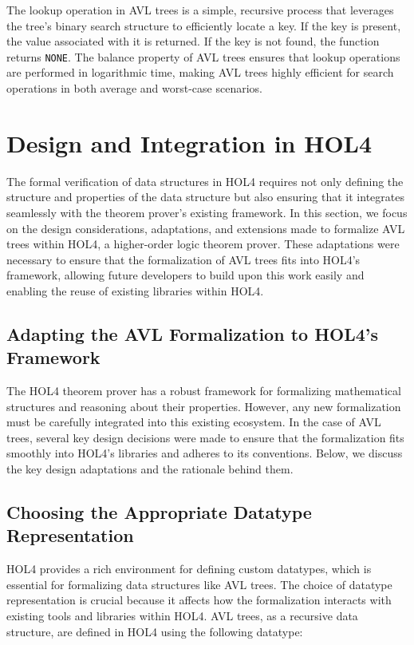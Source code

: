 \documentclass[12pt]{article}
\begin{document}
\begin{itemize}
The lookup operation in AVL trees is a simple, recursive process that leverages the tree's binary search structure to efficiently locate a key. If the key is present, the value associated with it is returned. If the key is not found, the function returns \texttt{NONE}. The balance property of AVL trees ensures that lookup operations are performed in logarithmic time, making AVL trees highly efficient for search operations in both average and worst-case scenarios.



\section{Design and Integration in HOL4}

The formal verification of data structures in HOL4 requires not only defining the structure and properties of the data structure but also ensuring that it integrates seamlessly with the theorem prover's existing framework. In this section, we focus on the design considerations, adaptations, and extensions made to formalize AVL trees within HOL4, a higher-order logic theorem prover. These adaptations were necessary to ensure that the formalization of AVL trees fits into HOL4’s framework, allowing future developers to build upon this work easily and enabling the reuse of existing libraries within HOL4.

\subsection{Adapting the AVL Formalization to HOL4’s Framework}

The HOL4 theorem prover has a robust framework for formalizing mathematical structures and reasoning about their properties. However, any new formalization must be carefully integrated into this existing ecosystem. In the case of AVL trees, several key design decisions were made to ensure that the formalization fits smoothly into HOL4’s libraries and adheres to its conventions. Below, we discuss the key design adaptations and the rationale behind them.


\subsection{Choosing the Appropriate Datatype Representation}

HOL4 provides a rich environment for defining custom datatypes, which is essential for formalizing data structures like AVL trees. The choice of datatype representation is crucial because it affects how the formalization interacts with existing tools and libraries within HOL4. AVL trees, as a recursive data structure, are defined in HOL4 using the following datatype:


\end{itemize}
\end{document}
